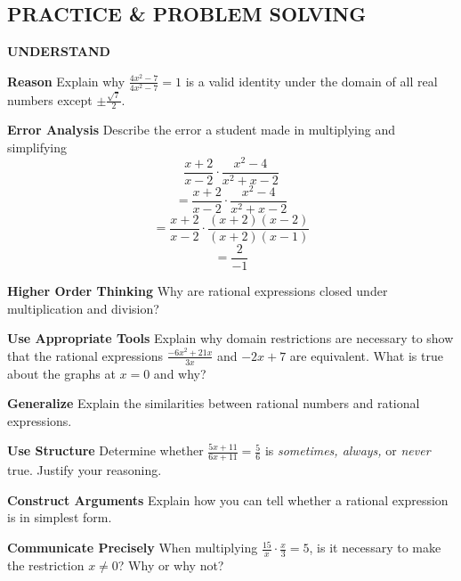 \documentclass{article}
\newenvironment{practice}[2]{}{}
\begin{document}
\subsection*{PRACTICE \& PROBLEM SOLVING}

\textbf{UNDERSTAND}

\begin{practice}{11}{1}
\textbf{Reason} Explain why $\frac{4x^2 - 7}{4x^2 - 7} = 1$ is a valid identity under the domain of all real numbers except $\pm \frac{\sqrt{7}}{2}$.
\end{practice}

\begin{practice}{12}{1}
\textbf{Error Analysis} Describe the error a student made in multiplying and simplifying
$$ \frac{x + 2}{x - 2} \cdot \frac{x^2 - 4}{x^2 + x - 2} $$
$$ = \frac{x + 2}{x - 2} \cdot \frac{x^2 - 4}{x^2 + x - 2} $$
$$ = \frac{x + 2}{x - 2} \cdot \frac{(x + 2)(x - 2)}{(x + 2)(x - 1)} $$
$$ = \frac{2}{-1} $$
\end{practice}

\begin{practice}{13}{1}
\textbf{Higher Order Thinking} Why are rational expressions closed under multiplication and division?
\end{practice}

\begin{practice}{14}{1}
\textbf{Use Appropriate Tools} Explain why domain restrictions are necessary to show that the rational expressions $\frac{-6x^2 + 21x}{3x}$ and $-2x + 7$ are equivalent. What is true about the graphs at $x = 0$ and why?
\end{practice}

\begin{practice}{15}{1}
\textbf{Generalize} Explain the similarities between rational numbers and rational expressions.
\end{practice}

\begin{practice}{16}{1}
\textbf{Use Structure} Determine whether $\frac{5x + 11}{6x + 11} = \frac{5}{6}$ is \emph{sometimes, always,} or \emph{never} true. Justify your reasoning.
\end{practice}

\begin{practice}{17}{1}
\textbf{Construct Arguments} Explain how you can tell whether a rational expression is in simplest form.
\end{practice}

\begin{practice}{18}{1}
\textbf{Communicate Precisely} When multiplying $\frac{15}{x} \cdot \frac{x}{3} = 5$, is it necessary to make the restriction $x \neq 0$? Why or why not?
\end{practice}
\end{document}
